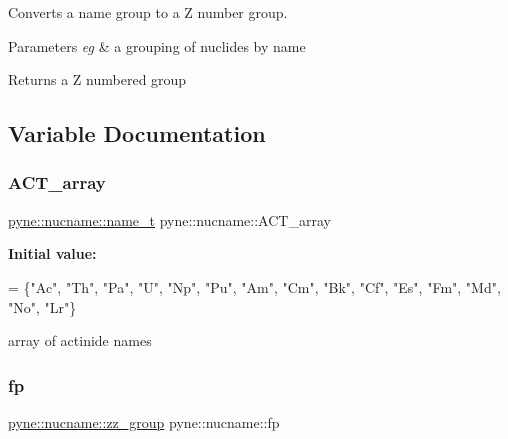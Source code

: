Converts a name group to a Z number group. 
\begin{DoxyParams}{Parameters}
{\em eg} & a grouping of nuclides by name \\
\hline
\end{DoxyParams}
\begin{DoxyReturn}{Returns}
a Z numbered group 
\end{DoxyReturn}


\subsection{Variable Documentation}
\mbox{\label{namespacepyne_1_1nucname_a5b7bd8782296656958a06b01b78f78ba}} 
\subsubsection{\texorpdfstring{A\+C\+T\+\_\+array}{ACT\_array}}
{\footnotesize\ttfamily \hyperlink{namespacepyne_1_1nucname_aed6b656cde69b79b33f6af37fabb2054}{pyne\+::nucname\+::name\+\_\+t} pyne\+::nucname\+::\+A\+C\+T\+\_\+array}

{\bfseries Initial value\+:}
\begin{DoxyCode}
= \{\textcolor{stringliteral}{"Ac"}, \textcolor{stringliteral}{"Th"}, \textcolor{stringliteral}{"Pa"}, \textcolor{stringliteral}{"U"},
  \textcolor{stringliteral}{"Np"}, \textcolor{stringliteral}{"Pu"}, \textcolor{stringliteral}{"Am"}, \textcolor{stringliteral}{"Cm"}, \textcolor{stringliteral}{"Bk"}, \textcolor{stringliteral}{"Cf"}, \textcolor{stringliteral}{"Es"}, \textcolor{stringliteral}{"Fm"}, \textcolor{stringliteral}{"Md"}, \textcolor{stringliteral}{"No"}, \textcolor{stringliteral}{"Lr"}\}
\end{DoxyCode}


array of actinide names 

\mbox{\label{namespacepyne_1_1nucname_af68a1a81d3f03a77d9f7df73254d3b94}} 
\subsubsection{\texorpdfstring{fp}{fp}}
{\footnotesize\ttfamily \hyperlink{namespacepyne_1_1nucname_a2e9463e61005389bbc50bfa210061582}{pyne\+::nucname\+::zz\+\_\+group} pyne\+::nucname\+::fp}


